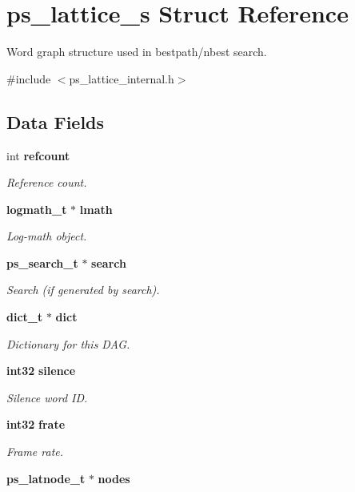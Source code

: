 \section{ps\-\_\-lattice\-\_\-s \-Struct \-Reference}
\label{structps__lattice__s}


\-Word graph structure used in bestpath/nbest search.  




{\ttfamily \#include $<$ps\-\_\-lattice\-\_\-internal.\-h$>$}

\subsection*{\-Data \-Fields}
\begin{DoxyCompactItemize}
\item 
int {\bf refcount}
\begin{DoxyCompactList}\small\item\em \-Reference count. \end{DoxyCompactList}\item 
{\bf logmath\-\_\-t} $\ast$ {\bf lmath}
\begin{DoxyCompactList}\small\item\em \-Log-\/math object. \end{DoxyCompactList}\item 
{\bf ps\-\_\-search\-\_\-t} $\ast$ {\bf search}
\begin{DoxyCompactList}\small\item\em \-Search (if generated by search). \end{DoxyCompactList}\item 
{\bf dict\-\_\-t} $\ast$ {\bf dict}
\begin{DoxyCompactList}\small\item\em \-Dictionary for this \-D\-A\-G. \end{DoxyCompactList}\item 
{\bf int32} {\bf silence}
\begin{DoxyCompactList}\small\item\em \-Silence word \-I\-D. \end{DoxyCompactList}\item 
{\bf int32} {\bf frate}
\begin{DoxyCompactList}\small\item\em \-Frame rate. \end{DoxyCompactList}\item 
{\bf ps\-\_\-latnode\-\_\-t} $\ast$ {\bf nodes}

\end{DoxyCompactItemize}
